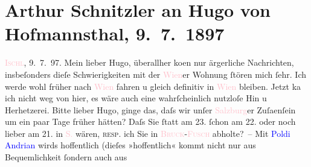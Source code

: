

               \section[Arthur Schnitzler an Hugo von Hofmannsthal, 9. 7. 1897]{ Arthur Schnitzler an Hugo von Hofmannsthal,
                    9. 7. 1897}\nopagebreak{}\rehead{ }\normalsize\beginnumbering{} \toendnotes[C]{\smallbreak\pagebreak[2]} 
\pstart
           \raggedleft{}{\pb}\textcolor{pink}{\textsc{Ischl}}{}\ledrightnote{\textcolor{pink}{Bad Ischl}}, 9. 7. 97.\pend
           \pstart
           Mein lieber Hugo, überallher ko{\geminationm}en
                    nur ärgerliche Nachrichten, insbeſonders dieſe Schwierigkeiten mit der \textcolor{pink}{Wien}{}\ledrightnote{\textcolor{pink}{Wien}}er Wohnung ſtören mich ſehr. Ich werde
                    wohl früher nach \textcolor{pink}{Wien}{}\ledrightnote{\textcolor{pink}{Wien}} fahren u gleich
                    definitiv in \textcolor{pink}{Wien}{}\ledrightnote{\textcolor{pink}{Wien}} bleiben.\pend
           \pstart
           Jetzt ka{\geminationn} ich nicht weg von hier, es wäre auch eine
                    wahrſcheinlich nutzloſe Hin u Herhetzerei. {\pb}Bitte
                    lieber Hugo, ginge das, daſs wir unſer \textcolor{pink}{Salzburg}{}\ledrightnote{\textcolor{pink}{Salzburg}}er Zuſa{\geminationm}enſein um ein paar Tage
                    früher hätten? Daſs Sie ſtatt am 23.{ }ſchon am 22. oder
                    noch lieber am 21. in \textcolor{pink}{S.}{}\ledrightnote{\textcolor{pink}{Salzburg}} wären,
                        \textsc{resp.} ich Sie in \textcolor{pink}{\textsc{Bruck}}{}\ledrightnote{\textcolor{pink}{Bruck an der Großglocknerstraße}}-\textcolor{pink}{\textsc{Fusch}}{}\ledrightnote{\textcolor{pink}{Fusch an der Großglocknerstraße}} abholte? –\pend
           \pstart
           Mit \textcolor{blue}{Poldi Andrian}{}\ledrightnote{\textcolor{blue}{Leopold von Andrian-Werburg}} wirds hoffentlich
                    (dieſes »hoffentlich« kommt nicht nur aus Bequemlichkeit ſondern auch aus
